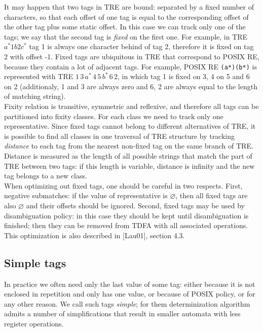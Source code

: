 \documentclass{article}
\theoremstyle{definition}
\begin{document}
\begin{multicols}{2}
It may happen that two tags in TRE are bound: separated by a fixed number of characters, so that
each offset of one tag is equal to the corresponding offset of the other tag plus some static offset.
In this case we can track only one of the tags; we say that the second tag is \emph{fixed} on the first one.
For example, in TRE $a^* 1 b 2 c^*$ tag 1 is always one character behind of tag 2,
therefore it is fixed on tag 2 with offset -1.
Fixed tags are ubiquitous in TRE that correspond to POSIX RE, because they contain a lot of adjacent tags.
For example, POSIX RE \texttt{(a*)(b*)} is represented with TRE $1 \, 3 \, a^* \, 4 \, 5 \, b^* \, 6 \, 2$,
in which tag 1 is fixed on 3, 4 on 5 and 6 on 2
(additionaly, 1 and 3 are always zero and 6, 2 are always equal to the length of matching string).
\\

Fixity relation is transitive, symmetric and reflexive,
and therefore all tags can be partitioned into fixity classes.
For each class we need to track only one representative.
Since fixed tags cannot belong to different alternatives of TRE,
it is possible to find all classes in one traversal of TRE structure
by tracking \emph{distance} to each tag from the nearest non-fixed tag on the same branch of TRE.
Distance is measured as the length of all possible strings that match the part of TRE between two tags:
if this length is variable, distance is infinity and the new tag belongs to a new class.
\\

When optimizing out fixed tags, one should be careful in two respects.
First, negative submatches: if the value of representative is $\varnothing$,
then all fixed tags are also $\varnothing$ and their offsets should be ignored.
Second, fixed tags may be used by disambiguation policy:
in this case they should be kept until disambiguation is finished;
then they can be removed from TDFA with all associated operations.
\\

This optimization is also described in [Lau01], section 4.3.

\subsection*{Simple tags}

In practice we often need only the last value of some tag:
either because it is not enclosed in repetition and only has one value, or because of POSIX policy, or for any other reason.
We call such tags \emph{simple};
for them determinization algorithm admits a number of simplifications
that result in smaller automata with less register operations.
\\


\end{multicols}
\end{document}

